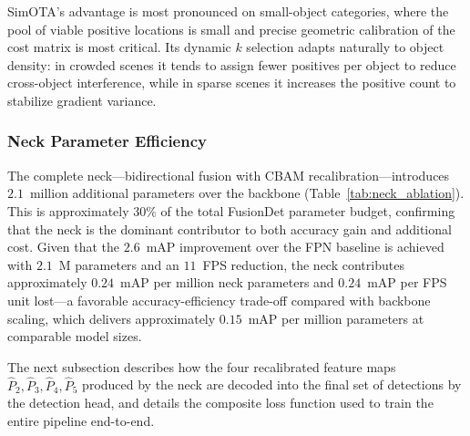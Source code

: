 SimOTA's advantage is most pronounced on small-object categories,
where the pool of viable positive locations is small and
precise geometric calibration of the cost matrix is most
critical.  Its dynamic $k$ selection adapts naturally to object
density: in crowded scenes it tends to assign fewer positives
per object to reduce cross-object interference, while in sparse
scenes it increases the positive count to stabilize gradient
variance.

\subsubsection{Neck Parameter Efficiency}

The complete neck---bidirectional fusion with CBAM
recalibration---introduces $2.1$~million additional
parameters over the backbone (Table~\ref{tab:neck_ablation}).
This is approximately $30\%$ of the total FusionDet parameter
budget, confirming that the neck is the dominant contributor
to both accuracy gain and additional cost.  Given that the
$2.6$~mAP improvement over the FPN baseline is achieved with
$2.1$~M parameters and an $11$~FPS reduction, the neck
contributes approximately $0.24$~mAP per million neck
parameters and $0.24$~mAP per FPS unit lost---a favorable
accuracy-efficiency trade-off compared with backbone scaling,
which delivers approximately $0.15$~mAP per million parameters
at comparable model sizes.

The next subsection describes how the four recalibrated feature
maps $\hat{P}_2, \hat{P}_3, \hat{P}_4, \hat{P}_5$ produced by
the neck are decoded into the final set of detections by the
detection head, and details the composite loss function used to
train the entire pipeline end-to-end.
